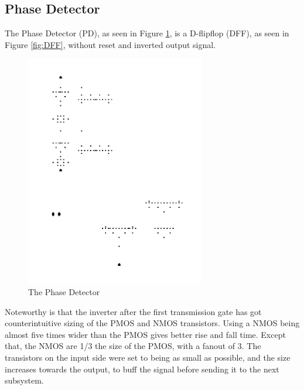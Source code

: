 \documentclass[a4paper,12pt]{article} \usepackage{graphicx}
\begin{document}
\subsection{Phase Detector}
The Phase Detector (PD), as seen in Figure \ref{fig:PD}, is a D-flipflop (DFF), as seen in Figure \ref{fig:DFF}, without
reset and inverted output signal.

\begin{figure}
\centering
\includegraphics[width=0.7\textwidth, angle = 270]{../Bilder/Phase_detector_trans.png}
\caption{The Phase Detector}
\label{fig:PD}
\end{figure}

Noteworthy is that the inverter after the first transmission gate has got counterintuitive sizing of the PMOS and NMOS transistors.
Using a NMOS being almost five times wider than the PMOS gives better rise and fall time. Except that, the NMOS are 1/3 the size of the
PMOS, with a fanout of 3. The transistors on the input side were set to being as small as possible, and the size increases towards the
output, to buff the signal before sending it to the next subsystem.
\end{document}
